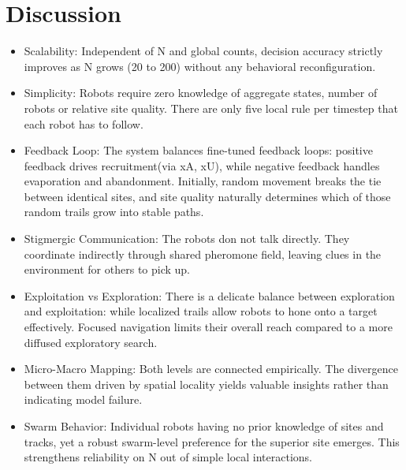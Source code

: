 \documentclass{article}
\begin{document}
\section {Discussion}
\begin{itemize}
    \item Scalability: Independent of N and global counts, decision accuracy strictly improves as N grows (20 to 200) without any behavioral reconfiguration.
    \item Simplicity: Robots require zero knowledge of aggregate states, number of robots or relative site quality. There are only five local rule per timestep that each robot has to follow.
    \item Feedback Loop: The system balances fine-tuned feedback loops: positive feedback drives recruitment(via xA, xU), while negative feedback handles evaporation and abandonment. Initially, random movement breaks the tie between identical sites, and site quality naturally determines which of those random trails grow into stable paths. 
    \item Stigmergic Communication: The robots don not talk directly. They coordinate indirectly through shared pheromone field, leaving clues in the environment for others to pick up.
    \item Exploitation vs Exploration: There is a delicate balance between exploration and exploitation: while localized trails allow robots to hone onto a target effectively. Focused navigation limits their overall reach compared to a more diffused exploratory search.
    \item Micro-Macro Mapping: Both levels are connected empirically. The divergence between them driven by spatial locality yields valuable insights rather than indicating model failure. 
    \item Swarm Behavior: Individual robots having no prior knowledge of sites and tracks, yet a robust swarm-level preference for the superior site emerges. This strengthens reliability on N out of simple local interactions.
\end{itemize}
\end{document}
